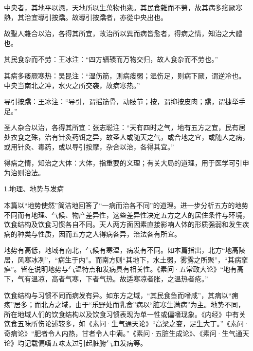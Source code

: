 \documentclass[draft,12pt]{ctexbook}
\begin{document}

\begin{yuanwen}
中央者，其地平以濕，天地所以生萬物也衆。其民食雜而不勞，故其病多痿厥寒熱，其治宜導引按蹻。故導引按蹻者，亦從中央出也。

故聖人雜合以治，各得其所宜，故治所以異而病皆愈者，得病之情，知治之大體也。
\end{yuanwen}


\begin{jiaozhu}
  \item 其民食杂而不劳：王冰注：“四方辐辏而万物交归，故人食杂而不劳也。”
  \item 其病多痿厥寒热：吴昆注：“湿伤筋，则病瘘弱；湿伤足，则病下厥，谓逆冷也。中央当南北之冲，水火之所交袭，故病寒热。”
  \item 导引按蹻：王冰注：“导引，谓摇筋骨，动肢节；按，谓抑按皮肉；蹻，谓捷举手足。”
  \item 圣人杂合以治，各得其所宜：张志聪注：“天有四时之气，地有五方之宜，民有居处衣食之殊，治有针灸药饵之异，故圣人或随天之气，或合地之宜，或随人之病，或用针灸、毒药，或以导引按摩，杂合以治，各得其宜。”
  \item 得病之情，知治之大体：大体，指重要的义理；有关大局的道理，用于医学可引申为治则治法。
\end{jiaozhu}


1.地理、地势与发病

本篇以“地势使然”简洁地回答了“一病而治各不同”的道理。进一步分析五方的地势不同而有地理、气候、物产差异性，这些差异性决定五方之人的居住条件与环境，饮食结构及饮食习惯各自不同。天人两方面因素直接影响人体的形质强弱和发生疾病的种类与性质，因而五方之人得病各异，治法各有所宜。

地势有高低，地域有南北，气候有寒温，病发有不同。如本篇指出，北方“地高陵居，风寒冰冽”，“病生于内”。而南方则“其地下，水土弱，雾露之所聚”，“其病挛痹”。皆在说明地势与气温特点和发病具有相关性。《素问·五常政大论》“地有高下，气有温凉，高者气寒，下者气热。故适寒凉者胀，之温热者疮。”

饮食结构与习惯不同而病发有异。如东方之域，“其民食鱼而嗜咸”，其病以“痈疡”居多；而北方之域，由于“乐野处而乳食”病以“脏寒生满病”为主。地势不同，所在地域人们的饮食结构以及饮食习惯表现为单一性或偏嗜现象。《内经》中有关饮食五味所伤论述较多，如《素问·生气通天论》“高梁之变，足生大丁。”《素问·奇病论》“肥者令人内热，甘者令人中满。”《素问·五脏生成论》、《素问·生气通天论》均记载偏嗜五味太过引起脏腑气血发病等。
\end{document}

